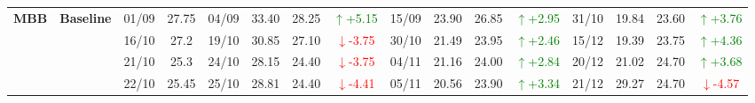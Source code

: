 \documentclass{ieeeaccess}
\begin{document}
{\begin{longtable}{llcc|cccc|cccc|cccc}
\multirow{4}{*}{\textbf{MBB}}
& \textbf{Baseline}
& 01/09 & 27.75 & 04/09 & 33.40 & 28.25 & \textcolor{green}{\(\uparrow\)+5.15} & 15/09 & 23.90 & 26.85 & \textcolor{green}{\(\uparrow\)+2.95} & 31/10 & 19.84 & 23.60 & \textcolor{green}{\(\uparrow\)+3.76} \\
& & 16/10 & 27.2 & 19/10 & 30.85 & 27.10 & \textcolor{red}{\(\downarrow\)-3.75} & 30/10 & 21.49 & 23.95 & \textcolor{green}{\(\uparrow\)+2.46} & 15/12 & 19.39 & 23.75 & \textcolor{green}{\(\uparrow\)+4.36} \\
& & 21/10 & 25.3 & 24/10 & 28.15 & 24.40 & \textcolor{red}{\(\downarrow\)-3.75} & 04/11 & 21.16 & 24.00 & \textcolor{green}{\(\uparrow\)+2.84} & 20/12 & 21.02 & 24.70 & \textcolor{green}{\(\uparrow\)+3.68} \\
& & 22/10 & 25.45 & 25/10 & 28.81 & 24.40 & \textcolor{red}{\(\downarrow\)-4.41} & 05/11 & 20.56 & 23.90 & \textcolor{green}{\(\uparrow\)+3.34} & 21/12 & 29.27 & 24.70 & \textcolor{red}{\(\downarrow\)-4.57} \\
\midrule

\end{longtable}
}

\clearpage
\onecolumn
\end{document}
